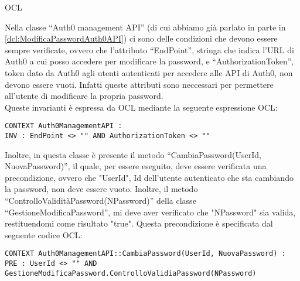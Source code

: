 \begin{listaPersonale}{OCL}
    \begin{center}
        
    \end{center}
    Nella classe “Auth0 management API” (di cui abbiamo già parlato in parte in \ref{dcl:ModificaPasswordAuth0API}) ci sono delle condizioni che devono essere sempre verificate, ovvero che l'attributo “EndPoint”, stringa che indica l'URL di Auth0 a cui posso accedere per modificare la password, e “AuthorizationToken”, token dato da Auth0 agli utenti autenticati per accedere alle API di Auth0, non devono essere vuoti. Infatti queste attributi sono neccessari per permettere all'utente di modificare la propria password.\\
    Queste invarianti è espressa da OCL mediante la seguente espressione OCL:
    \begin{lstlisting}
CONTEXT Auth0ManagementAPI :
INV : EndPoint <> "" AND AuthorizationToken <> ""
    \end{lstlisting}
    Inoltre, in questa classe è presente il metodo “CambiaPassword(UserId, NuovaPassword)”, il quale, per essere eseguito, deve essere verificata una precondizione, ovvero che "UserId", Id dell'utente autenticato che sta cambiando la password, non deve essere vuoto. Inoltre, il metodo “ControlloValiditàPassword(NPassword)” della classe “GestioneModificaPassword”, mi deve aver verificato che "NPassword" sia valida, restituendomi come risultato "true". Questa precondizione è specificata dal seguente codice OCL:
    \begin{lstlisting}
CONTEXT Auth0ManagementAPI::CambiaPassword(UserId, NuovaPassword) :
PRE : UserId <> "" AND GestioneModificaPassword.ControlloValidiaPassword(NPassword)
    \end{lstlisting}





\end{listaPersonale}
